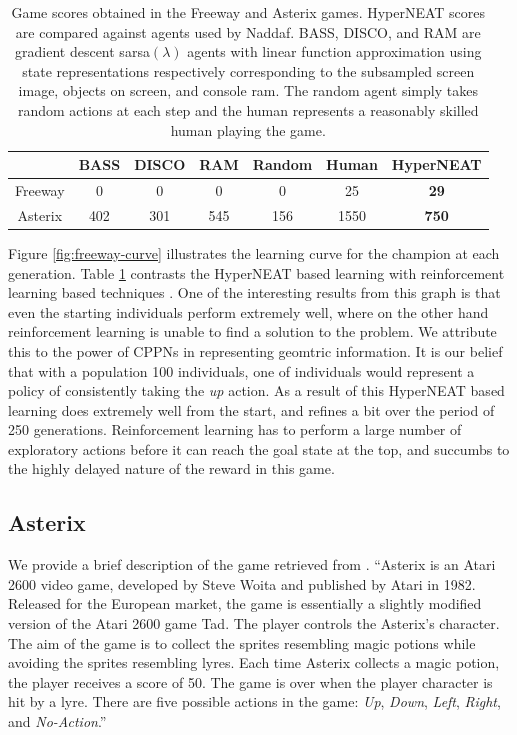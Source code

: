 \documentclass{acm_proc_article-sp}
\begin{document}
\begin{table}
\begin{center}
\begin{tabular}{|c|c|c|c|c|c|c|}
\hline
~       & BASS & DISCO & RAM & Random & Human & HyperNEAT \\ \hline
Freeway & 0    & 0     & 0   & 0      & 25    & \textbf{29}        \\ \hline
Asterix & 402  & 301   & 545 & 156    & 1550  & \textbf{750}       \\ 
\hline
\end{tabular}
\end{center}
\label{tab:results-table}
\caption{Game scores obtained in the Freeway and Asterix games. HyperNEAT scores are compared against agents used by Naddaf\cite{naddaf10}. BASS, DISCO, and RAM are gradient descent sarsa$(\lambda)$ agents with linear function approximation using state representations respectively corresponding to the subsampled screen image, objects on screen, and console ram. The random agent simply takes random actions at each step and the human represents a reasonably skilled human playing the game.}
\end{table}

Figure \ref{fig:freeway-curve} illustrates the learning curve for the champion at each generation. Table \ref{tab:results-table} contrasts the HyperNEAT based learning with reinforcement learning based techniques \cite{naddaf10}. One of the interesting results from this graph is that even the starting individuals perform extremely well, where on the other hand reinforcement learning is unable to find a solution to the problem. We attribute this to the power of CPPNs in representing geomtric information. It is our belief that with a population 100 individuals, one of individuals would represent a policy of consistently taking the \textit{up} action. As a result of this HyperNEAT based learning does extremely well from the start, and refines a bit over the period of 250 generations. Reinforcement learning has to perform a large number of exploratory actions before it can reach the goal state at the top, and succumbs to the highly delayed nature of the reward in this game.

\subsection {Asterix}
We provide a brief description of the game retrieved from \cite{naddaf10}. ``Asterix is an Atari 2600 video game, developed by Steve Woita and published by Atari in 1982. Released for the European market, the game is essentially a slightly modified version of the Atari 2600 game Tad. The player controls the Asterix’s character. The aim of the game is to collect the sprites resembling magic potions while avoiding the sprites resembling lyres. Each time Asterix collects a magic potion, the player receives a score of 50. The game is over when the player character is hit by a lyre. There are five possible actions in the game: \textit{Up}, \textit{Down}, \textit{Left}, \textit{Right}, and \textit{No-Action}.''
\end{document}
